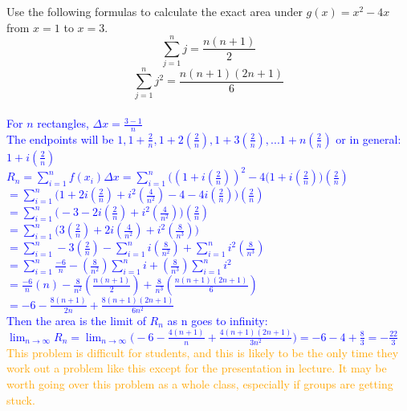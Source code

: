 \documentclass{ximera}
\begin{document}
\begin{exercise}
    Use the following formulas to calculate the exact area under $g(x)=x^2-4x$ from $x=1$ to $x=3$.  $$\sum_{j=1}^{n} j=\frac{n(n+1)}{2}$$
    $$\sum_{j=1}^n j^2=\frac{n(n+1)(2n+1)}{6}$$\\
    \textcolor{blue}{For $n$ rectangles, $\Delta x=\frac{3-1}{n}$\\
    The endpoints will be $1, 1+\frac{2}{n}, 1+2(\frac{2}{n}), 1+3(\frac{2}{n}), ... 1+n(\frac{2}{n})$ or in general: $1+i(\frac{2}{n})$\\
    $\displaystyle R_n=\sum_{i=1}^n f(x_i)\Delta x=\sum_{i=1}^n \bigg((1+i(\frac{2}{n}))^2-4(1+i(\frac{2}{n})\bigg)(\frac{2}{n})$ \\
    $\displaystyle =\sum_{i=1}^n \bigg(1+2i(\frac{2}{n})+i^2(\frac{4}{n^2})-4-4i(\frac{2}{n})\bigg)(\frac{2}{n})$\\
    $\displaystyle =\sum_{i=1}^n \bigg(-3-2i(\frac{2}{n})+i^2(\frac{4}{n^2})\bigg)(\frac{2}{n})$\\
    $\displaystyle =\sum_{i=1}^n \bigg(3(\frac{2}{n})+2i(\frac{4}{n^2})+i^2(\frac{8}{n^3})\bigg)$\\
    $\displaystyle=\sum_{i=1}^n -3(\frac{2}{n})-\sum_{i=1}^n i(\frac{8}{n^2})+\sum_{i=1}^n i^2(\frac{8}{n^3}) $\\
    $\displaystyle=\sum_{i=1}^n \frac{-6}{n}-(\frac{8}{n^2})\sum_{i=1}^n i+(\frac{8}{n^3})\sum_{i=1}^n i^2 $\\
    $\displaystyle =\frac{-6}{n}(n)-\frac{8}{n^2}(\frac{n(n+1)}{2})+\frac{8}{n^3}(\frac{n(n+1)(2n+1)}{6})$\\
    $\displaystyle =-6-\frac{8(n+1)}{2n}+\frac{8(n+1)(2n+1)}{6n^2}$\\
    Then the area is the limit of $R_n$ as n goes to infinity:\\
    $\displaystyle\lim_{n\rightarrow \infty} R_n=\lim_{n\rightarrow \infty} \bigg( -6-\frac{4(n+1)}{n}+\frac{4(n+1)(2n+1)}{3n^2}\bigg)=-6-4+\frac{8}{3}=-\frac{22}{3}$\\}
    \textcolor{orange}{This problem is difficult for students, and this is likely to be the only time they work out a problem like this except for the presentation in lecture.  It may be worth going over this problem as a whole class, especially if groups are getting stuck.  }
\end{exercise}   
\end{document}
